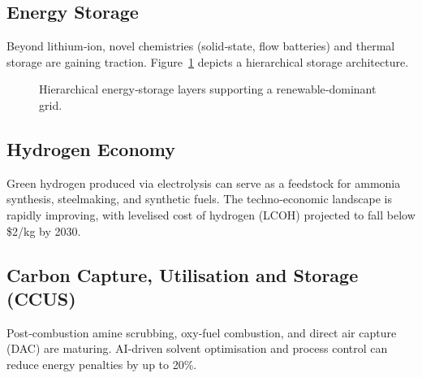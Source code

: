 \documentclass[conference]{IEEEtran}
\begin{document}
\subsection{Energy Storage}
Beyond lithium‑ion, novel chemistries (solid‑state, flow batteries) and thermal storage are gaining traction.  Figure~\ref{fig:storage_hierarchy} depicts a hierarchical storage architecture.

\begin{figure}[!t]
\centering
{}
\caption{Hierarchical energy‑storage layers supporting a renewable‑dominant grid.}
\label{fig:storage_hierarchy}
\end{figure}

\subsection{Hydrogen Economy}
Green hydrogen produced via electrolysis can serve as a feedstock for ammonia synthesis, steelmaking, and synthetic fuels.  The techno‑economic landscape is rapidly improving, with levelised cost of hydrogen (LCOH) projected to fall below \$2/kg by 2030.

\subsection{Carbon Capture, Utilisation and Storage (CCUS)}
Post‑combustion amine scrubbing, oxy‑fuel combustion, and direct air capture (DAC) are maturing.  AI‑driven solvent optimisation and process control can reduce energy penalties by up to 20\%.

\end{document}
